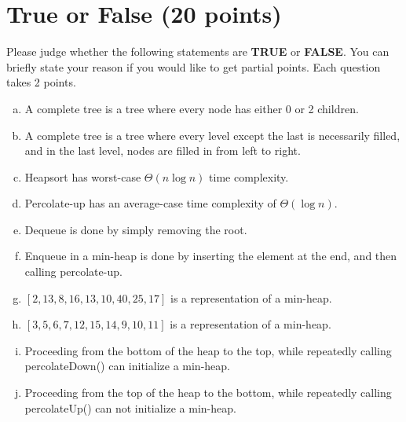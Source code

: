 \documentclass[11pt]{exam}
\begin{document}
\section{True or False (20 points)}
Please judge whether the following statements are \textbf{TRUE} or \textbf{FALSE}. You can briefly state your reason if you would like to get partial points. Each question takes 2 points.
	\begin{enumerate}[a)]
		\item A complete tree is a tree where every node has either 0 or 2 children.
		\begin{solution}
\end{solution}
		\item A complete tree is a tree where every level except the last is necessarily filled, and in the last level, nodes are filled in from left to right.
\begin{solution}
\end{solution}
		\item Heapsort has worst-case $\Theta(n \log n)$ time complexity.
		\begin{solution}
\end{solution}
		\item  Percolate-up has an average-case time complexity of $\Theta(\log n)$.
\begin{solution}
\end{solution}
		\item Dequeue is done by simply removing the root.
\begin{solution}
\end{solution}
		\item Enqueue in a min-heap is done by inserting the element at the end, and then calling percolate-up.
\begin{solution}
\end{solution}
		\item $[2, 13, 8, 16,  13, 10, 40, 25, 17]$ is a representation of a min-heap.
\begin{solution}
\end{solution}
		\item $[3, 5, 6, 7, 12, 15, 14, 9, 10, 11]$ is a representation of a min-heap.
\begin{solution}
\end{solution}
		\item  Proceeding from the bottom of the heap to the top, while repeatedly calling percolateDown() can initialize a min-heap.
\begin{solution}
\end{solution}
		\item Proceeding from the top of the heap to the bottom, while repeatedly calling percolateUp() can not initialize a min-heap.
		\begin{solution}
\end{solution}
	\end{enumerate}
\end{document}
